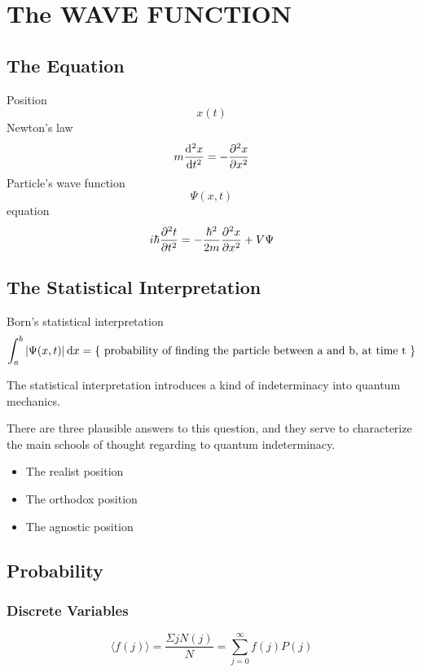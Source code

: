 \chapter{The WAVE FUNCTION}

\section{The \schrodinger{} Equation}

Position$$x(t)$$
Newton's law$$m\secd{x}{t}=-\fstpd{V}{x}$$
Particle's wave function$$\Psi(x,t)$$
\schrodinger{} equation$$i\hbar \secpd{\Psi}{t}=-\frac{\hbar^2}{2m}\secpd{\Psi}{x}+V\Psi$$

\section{The Statistical Interpretation}

Born's statistical interpretation
\begin{equation*}
	\int_{a}^{b}\left|\Psi(x,t)\right|\diff x = \left\lbrace\text{ probability of finding the particle between a and b, at time t }\right\rbrace 
\end{equation*}

The statistical interpretation introduces a kind of indeterminacy into quantum mechanics.

There are three plausible answers to this question, and they serve to characterize the main schools of thought regarding to quantum indeterminacy.

\begin{itemize}
	\item The realist position
	\item The orthodox position
	\item The agnostic position
\end{itemize}

\section{Probability}

\subsection{Discrete Variables}

\begin{equation*}
	\langle f(j)\rangle = \frac{\Sigma j N(j)}{N}=\sum_{j=0}^{\infty}f(j)P(j)
\end{equation*}

